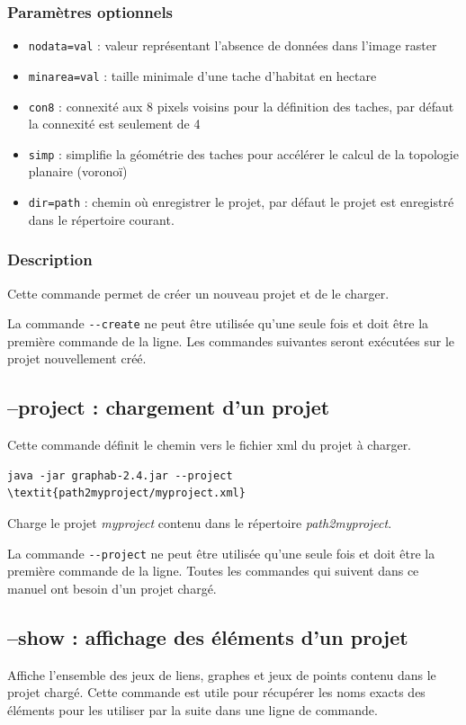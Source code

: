 \documentclass[a4paper,10pt]{report}
\begin{document}
\subsubsection{Paramètres optionnels}
\begin{itemize}
	\item \verb|nodata=val| : valeur représentant l'absence de données dans l'image raster
	\item \verb|minarea=val| : taille minimale d'une tache d'habitat en hectare
	\item \verb|con8| : connexité aux 8 pixels voisins pour la définition des taches, par défaut la connexité est seulement de 4
	\item \verb|simp| : simplifie la géométrie des taches pour accélérer le calcul de la topologie planaire (voronoï)
	\item \verb|dir=path| : chemin où enregistrer le projet, par défaut le projet est enregistré dans le répertoire courant.
\end{itemize}

\subsubsection{Description}
Cette commande permet de créer un nouveau projet et de le charger.

La commande \verb|--create| ne peut être utilisée qu'une seule fois et doit être la première commande de la ligne.
Les commandes suivantes seront exécutées sur le projet nouvellement créé.

\subsection{--project : chargement d'un projet}
Cette commande définit le chemin vers le fichier xml du projet à charger.
\begin{Verbatim}[commandchars=\\\{\}]
	java -jar graphab-2.4.jar --project \textit{path2myproject/myproject.xml}
\end{Verbatim}
Charge le projet \textit{myproject} contenu dans le répertoire \textit{path2myproject}.

La commande \verb|--project| ne peut être utilisée qu'une seule fois et doit être la première commande de la ligne.
Toutes les commandes qui suivent dans ce manuel ont besoin d'un projet chargé.

\subsection{--show : affichage des éléments d'un projet}
Affiche l'ensemble des jeux de liens, graphes et jeux de points contenu dans le projet chargé.
Cette commande est utile pour récupérer les noms exacts des éléments pour les utiliser par la suite dans une ligne de commande.
\end{document}
